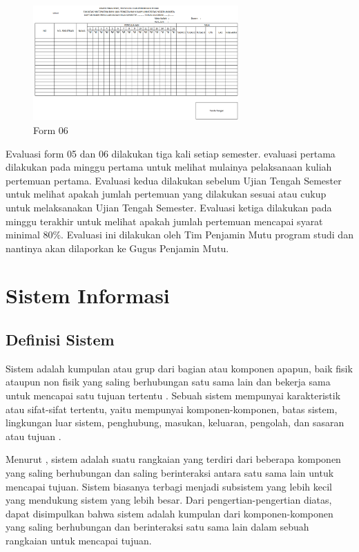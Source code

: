 \begin{figure}[h!]
	\centering
	\includegraphics[width=0.7\textwidth]{gambar/form06-gambaran}
	\caption{Form 06}
\end{figure}

	Evaluasi form 05 dan 06 dilakukan tiga kali setiap semester. evaluasi pertama dilakukan pada minggu pertama untuk melihat mulainya pelaksanaan kuliah pertemuan pertama. Evaluasi kedua dilakukan sebelum Ujian Tengah Semester untuk melihat apakah jumlah pertemuan yang dilakukan sesuai atau cukup untuk melaksanakan Ujian Tengah Semester. Evaluasi ketiga dilakukan pada minggu terakhir untuk melihat apakah jumlah pertemuan mencapai syarat minimal 80\%. Evaluasi ini dilakukan oleh Tim Penjamin Mutu program studi dan nantinya akan dilaporkan ke Gugus Penjamin Mutu.


\section{Sistem Informasi}
\subsection{Definisi Sistem}
	Sistem adalah kumpulan atau grup dari bagian atau komponen apapun, baik fisik ataupun non fisik yang saling berhubungan satu sama lain dan bekerja sama untuk mencapai satu tujuan tertentu \citep{Susanto2017}. Sebuah sistem mempunyai karakteristik atau sifat-sifat tertentu, yaitu mempunyai komponen-komponen, batas sistem, lingkungan luar sistem, penghubung, masukan, keluaran, pengolah, dan sasaran atau tujuan \citep{Ladjamudin2005}.

	Menurut \cite{Romney2009}, sistem adalah suatu rangkaian yang terdiri dari beberapa komponen yang saling berhubungan dan saling berinteraksi antara satu sama lain untuk mencapai tujuan. Sistem biasanya terbagi menjadi subsistem yang lebih kecil yang mendukung sistem yang lebih besar. Dari pengertian-pengertian diatas, dapat disimpulkan bahwa sistem adalah kumpulan dari komponen-komponen yang saling berhubungan dan berinteraksi satu sama lain dalam sebuah rangkaian untuk mencapai tujuan.

